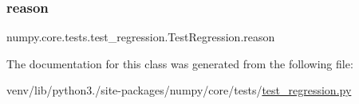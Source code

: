 \subsubsection{\texorpdfstring{reason}{reason}}
{\footnotesize\ttfamily numpy.\+core.\+tests.\+test\+\_\+regression.\+Test\+Regression.\+reason\hspace{0.3cm}{\ttfamily [static]}}



The documentation for this class was generated from the following file\+:\begin{DoxyCompactItemize}
\item 
venv/lib/python3./site-\/packages/numpy/core/tests/\hyperlink{core_2tests_2test__regression_8py}{test\+\_\+regression.\+py}\end{DoxyCompactItemize}

